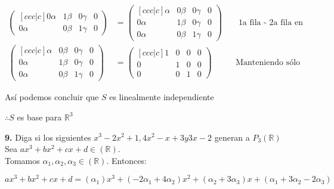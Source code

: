 \documentclass[letterpaper]{article}
\newcommand{\R}{\mathds{R}}
\renewcommand{\*}{\cdot}
\theoremstyle{definition}
\begin{document}
\begin{align*}
\begin{pmatrix}[ccc|c]
			 0\alpha & 1\beta & 0\gamma & 0\\
			 0\alpha & 0\beta & 1\gamma & 0
			 \end{pmatrix} & = \begin{pmatrix}[ccc|c]
			 \alpha & 0\beta & 0\gamma & 0\\
			 0\alpha & 1\beta & 0\gamma & 0\\
			 0\alpha & 0\beta & 1\gamma & 0
			 \end{pmatrix} && \text{ 1a fila - 2a fila en 1a fila}\\
			 \begin{pmatrix}[ccc|c]
			 \alpha & 0\beta & 0\gamma & 0\\
			 0\alpha & 1\beta & 0\gamma & 0\\
			 0\alpha & 0\beta & 1\gamma &0
			 \end{pmatrix} & = \begin{pmatrix}[ccc|c]
			 1 & 0 & 0 & 0\\
			 0 & 1 & 0 & 0\\
			 0 & 0 & 1 & 0
			 \end{pmatrix} &&  \text{Manteniendo sólo coeficientes}
		\end{align*}
		
		Así podemos concluir que $ S $ es linealmente independiente 
		\begin{center}
			$ \therefore S $ es base para $ \R^3 $
		\end{center}

\noindent \textbf{9.} Diga si los siguientes $x^3-2x^2+1,4x^2-x+3 y 3x-2$ generan a $P_{3}(\R)$\\

Sea $ax^3+bx^2+cx+d\in(\R)$.\\

Tomamos $\alpha_{1},\alpha_{2},\alpha_{3}\in (\R)$. Entonces:

$ax^3+bx^2+cx+d = (\alpha_{1})x^3 + (-2\alpha_{1}+4\alpha_{2})x^2 + (\alpha_{2}+3\alpha_{3})x + (\alpha_{1}+3\alpha_{2}-2\alpha_{3})$
\end{document}
